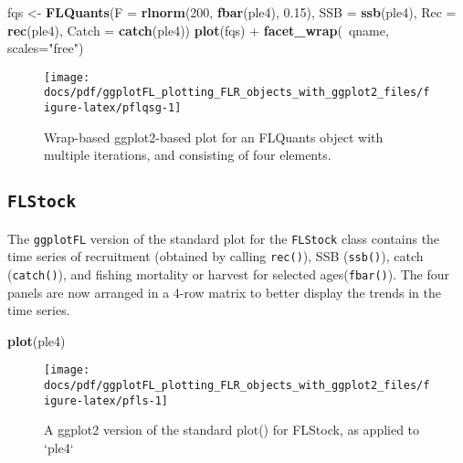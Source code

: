 \documentclass[]{article}
\newenvironment{Shaded}{\begin{snugshade}}{\end{snugshade}}
\newcommand{\KeywordTok}[1]{\textcolor[rgb]{0.13,0.29,0.53}{\textbf{{#1}}}}
\newcommand{\DataTypeTok}[1]{\textcolor[rgb]{0.13,0.29,0.53}{{#1}}}
\newcommand{\DecValTok}[1]{\textcolor[rgb]{0.00,0.00,0.81}{{#1}}}
\newcommand{\FloatTok}[1]{\textcolor[rgb]{0.00,0.00,0.81}{{#1}}}
\newcommand{\StringTok}[1]{\textcolor[rgb]{0.31,0.60,0.02}{{#1}}}
\newcommand{\NormalTok}[1]{{#1}}
\begin{document}
\begin{Shaded}
\begin{Highlighting}[]
\NormalTok{fqs <-}\StringTok{ }\KeywordTok{FLQuants}\NormalTok{(}\DataTypeTok{F =} \KeywordTok{rlnorm}\NormalTok{(}\DecValTok{200}\NormalTok{, }\KeywordTok{fbar}\NormalTok{(ple4), }\FloatTok{0.15}\NormalTok{), }\DataTypeTok{SSB =} \KeywordTok{ssb}\NormalTok{(ple4), }\DataTypeTok{Rec =} \KeywordTok{rec}\NormalTok{(ple4), }\DataTypeTok{Catch =} \KeywordTok{catch}\NormalTok{(ple4))}
\KeywordTok{plot}\NormalTok{(fqs) +}\StringTok{ }\KeywordTok{facet_wrap}\NormalTok{(~qname, }\DataTypeTok{scales=}\StringTok{"free"}\NormalTok{)}
\end{Highlighting}
\end{Shaded}

\begin{figure}

{\centering \texttt{[image: docs/pdf/ggplotFL\_plotting\_FLR\_objects\_with\_ggplot2\_files/figure-latex/pflqsg-1]} 

}

\caption{Wrap-based ggplot2-based plot for an FLQuants object with multiple iterations, and consisting of four elements.}\label{fig:pflqsg}
\end{figure}

\subsection{\texorpdfstring{\texttt{FLStock}}{FLStock}}\label{flstock-1}

The \texttt{ggplotFL} version of the standard plot for the
\texttt{FLStock} class contains the time series of recruitment (obtained
by calling \texttt{rec()}), SSB (\texttt{ssb()}), catch
(\texttt{catch()}), and fishing mortality or harvest for selected
ages(\texttt{fbar()}). The four panels are now arranged in a 4-row
matrix to better display the trends in the time series.

\begin{Shaded}
\begin{Highlighting}[]
\KeywordTok{plot}\NormalTok{(ple4)}
\end{Highlighting}
\end{Shaded}

\begin{figure}

{\centering \texttt{[image: docs/pdf/ggplotFL\_plotting\_FLR\_objects\_with\_ggplot2\_files/figure-latex/pfls-1]} 

}

\caption{A ggplot2 version of the standard plot() for FLStock, as applied to `ple4`}\label{fig:pfls}
\end{figure}
\end{document}
